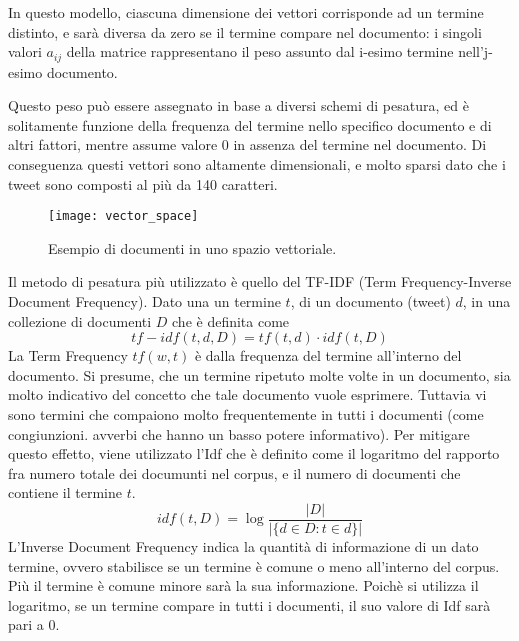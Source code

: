 In questo modello, ciascuna dimensione dei vettori corrisponde ad un termine distinto, e sarà diversa da zero se il termine compare nel documento: i singoli valori $a_{ij}$ della matrice rappresentano il peso
assunto dal i-esimo termine nell’j-esimo documento.

 Questo peso può essere assegnato in base a  diversi schemi di pesatura, ed è solitamente funzione della frequenza del termine nello specifico documento e di altri fattori, mentre assume valore 0 in assenza del
termine nel documento. Di conseguenza questi vettori sono altamente dimensionali, e molto sparsi dato che i tweet sono composti al più da 140 caratteri. 

\begin{figure}[h]
    \centering
    \texttt{[image: vector\_space]}
    \caption{Esempio di documenti in uno spazio vettoriale.}
    \label{fig:vsm}
\end{figure}  


Il metodo di pesatura più utilizzato è quello del TF-IDF (Term Frequency-Inverse Document Frequency).
Dato una un termine  $t$, di un documento (tweet) $d$, in una collezione di documenti $D$
che è definita come  
\begin{equation}
tf-idf(t,d, D) =  tf(t,d)\cdot idf(t,D)
\end{equation}
La Term Frequency $tf(w,t)$ è dalla frequenza del termine all'interno del documento. Si presume, che un termine     ripetuto molte volte in un documento, sia molto indicativo del concetto che tale documento vuole esprimere.
Tuttavia vi sono termini che compaiono molto frequentemente in tutti i documenti (come congiunzioni. avverbi che hanno un basso potere informativo).
Per  mitigare questo effetto, viene utilizzato l'Idf che è definito come il logaritmo del rapporto fra numero totale dei documunti nel corpus, e il numero di documenti che contiene il termine $t$.
\begin{equation}
idf(t, D) =  \log \frac{|D|}{|\{d \in D: t \in d\}|}
\end{equation}
L'Inverse Document Frequency   indica la quantità di informazione di un dato termine, ovvero stabilisce se un termine è comune o meno all'interno del corpus. Più il termine è comune minore sarà la sua informazione. 
Poichè si utilizza il logaritmo, se un termine compare in tutti i documenti, il suo valore di Idf sarà pari a 0.

